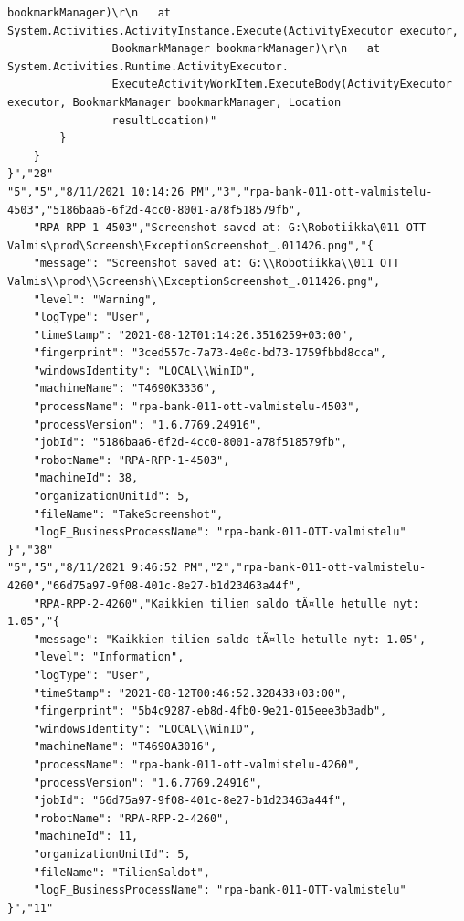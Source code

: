 \begin{Verbatim}[fontsize=\tiny]
                bookmarkManager)\r\n   at System.Activities.ActivityInstance.Execute(ActivityExecutor executor,
                BookmarkManager bookmarkManager)\r\n   at System.Activities.Runtime.ActivityExecutor.
                ExecuteActivityWorkItem.ExecuteBody(ActivityExecutor executor, BookmarkManager bookmarkManager, Location
                resultLocation)"
        }
    }
}","28"
"5","5","8/11/2021 10:14:26 PM","3","rpa-bank-011-ott-valmistelu-4503","5186baa6-6f2d-4cc0-8001-a78f518579fb",
    "RPA-RPP-1-4503","Screenshot saved at: G:\Robotiikka\011 OTT Valmis\prod\Screensh\ExceptionScreenshot_.011426.png","{
    "message": "Screenshot saved at: G:\\Robotiikka\\011 OTT Valmis\\prod\\Screensh\\ExceptionScreenshot_.011426.png",
    "level": "Warning",
    "logType": "User",
    "timeStamp": "2021-08-12T01:14:26.3516259+03:00",
    "fingerprint": "3ced557c-7a73-4e0c-bd73-1759fbbd8cca",
    "windowsIdentity": "LOCAL\\WinID",
    "machineName": "T4690K3336",
    "processName": "rpa-bank-011-ott-valmistelu-4503",
    "processVersion": "1.6.7769.24916",
    "jobId": "5186baa6-6f2d-4cc0-8001-a78f518579fb",
    "robotName": "RPA-RPP-1-4503",
    "machineId": 38,
    "organizationUnitId": 5,
    "fileName": "TakeScreenshot",
    "logF_BusinessProcessName": "rpa-bank-011-OTT-valmistelu"
}","38"
"5","5","8/11/2021 9:46:52 PM","2","rpa-bank-011-ott-valmistelu-4260","66d75a97-9f08-401c-8e27-b1d23463a44f",
    "RPA-RPP-2-4260","Kaikkien tilien saldo tÃ¤lle hetulle nyt: 1.05","{
    "message": "Kaikkien tilien saldo tÃ¤lle hetulle nyt: 1.05",
    "level": "Information",
    "logType": "User",
    "timeStamp": "2021-08-12T00:46:52.328433+03:00",
    "fingerprint": "5b4c9287-eb8d-4fb0-9e21-015eee3b3adb",
    "windowsIdentity": "LOCAL\\WinID",
    "machineName": "T4690A3016",
    "processName": "rpa-bank-011-ott-valmistelu-4260",
    "processVersion": "1.6.7769.24916",
    "jobId": "66d75a97-9f08-401c-8e27-b1d23463a44f",
    "robotName": "RPA-RPP-2-4260",
    "machineId": 11,
    "organizationUnitId": 5,
    "fileName": "TilienSaldot",
    "logF_BusinessProcessName": "rpa-bank-011-OTT-valmistelu"
}","11"

\end{Verbatim}

\clearpage


